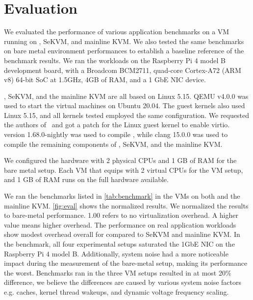 \chapter{Evaluation}
\label{sec:eval}

We evaluated the performance of various application benchmarks
on a VM running on \rustsec{}, SeKVM, and mainline KVM.
We also tested the same
benchmarks on bare metal environment performances to establish a baseline
reference of the benchmark results. We ran the workloads on the Raspberry
Pi 4 model B development board, with a Broadcom BCM2711, quad-core
Cortex-A72 (ARM v8) 64-bit SoC at 1.5GHz, 4GB of RAM, and a 1 GbE NIC device.

\rustsec{}, SeKVM, and the mainline KVM are all based on Linux 5.15.
QEMU v4.0.0 was used to start the virtual machines on Ubuntu 20.04. The guest
kernels also used Linux 5.15, and all kernels tested employed the same 
configuration. We requested the authors of~\cite{hypsec} and got a patch for
the Linux guest kernel to enable virtio.
 version 1.68.0-nightly was used to compile \rustcore{},
while clang 15.0.0 was used to compile the remaining components of
\rustsec{}, SeKVM, and the mainline KVM.

We configured the hardware with 2 physical CPUs and 1 GB of RAM for the bare
metal setup. Each VM that equips with 2 virtual CPUs for the VM setup, and 1
GB of RAM runs on the full hardware available.

We ran the benchmarks listed in \autoref{tab:benchmark} in the VMs on both
\rustsec{} and the mainline KVM. \autoref{fig:eval} shows the normalized
results. We normalized the results to bare-metal performance. 1.00 refers
to no virtualization overhead.
A higher value means higher overhead. The performance on real application
workloads show modest overhead overall for \rustsec{} compared to SeKVM and
mainline KVM.
In the  benchmark, all four experimental setups saturated the
1GbE NIC on the Raspberry Pi 4 model B. Additionally, system noise had a more
noticeable impact during the measurement of the bare-metal setup, making its
performance the worst.
Benchmarks ran in the three VM setups resulted in at most 20\% difference,
we believe the differences are caused by various system noise factors e.g.
caches, kernel thread wakeups, and dynamic voltage frequency scaling.

